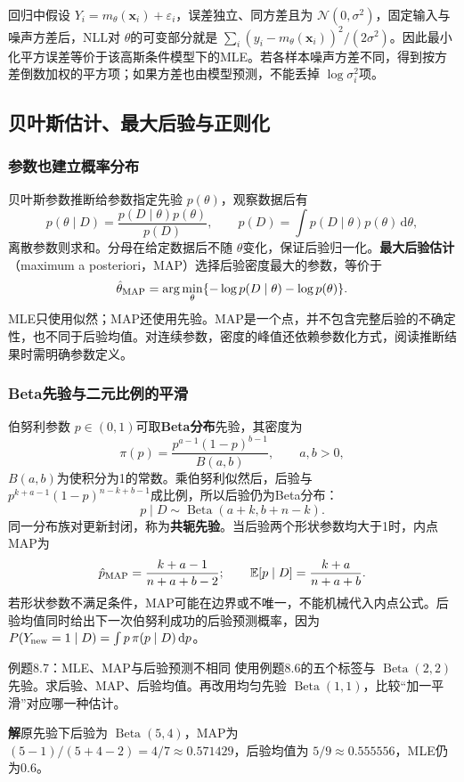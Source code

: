 \documentclass[UTF8,fontset=none,zihao=-4,a4paper]{ctexart}
\newcommand{\term}[1]{\textbf{#1}}
\newcommand{\sol}{\par\noindent\textbf{解}\quad}
\numberwithin{equation}{section}
\numberwithin{figure}{section}
\begin{document}
回归中假设 $Y_i=m_\theta(\symbf x_i)+\varepsilon_i$，误差独立、同方差且为 $\mathcal N(0,\sigma^2)$，固定输入与噪声方差后，NLL对 $\theta$的可变部分就是 $\sum_i(y_i-m_\theta(\symbf x_i))^2/(2\sigma^2)$。因此最小化平方误差等价于该高斯条件模型下的MLE。若各样本噪声方差不同，得到按方差倒数加权的平方项；如果方差也由模型预测，不能丢掉 $\log\sigma_i^2$项。

\subsection{贝叶斯估计、最大后验与正则化}
\subsubsection{参数也建立概率分布}
贝叶斯参数推断给参数指定先验 $p(\theta)$，观察数据后有
\[
 p(\theta\mid D)=\frac{p(D\mid\theta)p(\theta)}{p(D)},\qquad
 p(D)=\int p(D\mid\theta)p(\theta)\,\mathrm d\theta,
\]
离散参数则求和。分母在给定数据后不随 $\theta$变化，保证后验归一化。\term{最大后验估计}（maximum a posteriori，MAP）选择后验密度最大的参数，等价于
\[
 \hat\theta_{\rm MAP}=\arg\min_\theta\{-\log p(D\mid\theta)-\log p(\theta)\}.
\]
MLE只使用似然；MAP还使用先验。MAP是一个点，并不包含完整后验的不确定性，也不同于后验均值。对连续参数，密度的峰值还依赖参数化方式，阅读推断结果时需明确参数定义。

\subsubsection{Beta先验与二元比例的平滑}
伯努利参数 $p\in(0,1)$可取\term{Beta分布}先验，其密度为
\[
 \pi(p)=\frac{p^{a-1}(1-p)^{b-1}}{B(a,b)},\qquad a,b>0,
\]
$B(a,b)$为使积分为1的常数。乘伯努利似然后，后验与 $p^{k+a-1}(1-p)^{n-k+b-1}$成比例，所以后验仍为Beta分布：
\[
 p\mid D\sim\operatorname{Beta}(a+k,b+n-k).
\]
同一分布族对更新封闭，称为\term{共轭先验}。当后验两个形状参数均大于1时，内点MAP为
\[
 \hat p_{\rm MAP}=\frac{k+a-1}{n+a+b-2};
 \qquad \mathbb E[p\mid D]=\frac{k+a}{n+a+b}.
\]
若形状参数不满足条件，MAP可能在边界或不唯一，不能机械代入内点公式。后验均值同时给出下一次伯努利成功的后验预测概率，因为 $P(Y_{\rm new}=1\mid D)=\int p\,\pi(p\mid D)\,\mathrm dp$。

\begin{infobox}{例题8.7：MLE、MAP与后验预测不相同}
使用例题8.6的五个标签与 $\operatorname{Beta}(2,2)$先验。求后验、MAP、后验均值。再改用均匀先验 $\operatorname{Beta}(1,1)$，比较“加一平滑”对应哪一种估计。
\end{infobox}
\sol 原先验下后验为 $\operatorname{Beta}(5,4)$，MAP为 $(5-1)/(5+4-2)=4/7\approx0.571429$，后验均值为 $5/9\approx0.555556$，MLE仍为0.6。
\end{document}
